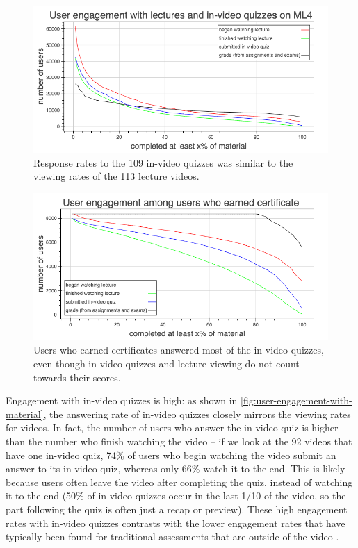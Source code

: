 \documentclass{sigchi}
\begin{document}
\begin{figure}
\includegraphics[width=1.0\columnwidth]{user-engagement-with-material}
\caption{Response rates to the 109 in-video quizzes was similar to the viewing rates of the 113 lecture videos.}
\label{fig:user-engagement-with-material}
\end{figure}

\begin{figure}
\includegraphics[width=1.0\columnwidth]{user-engagement-certificate}
\caption{Users who earned certificates answered most of the in-video quizzes, even though in-video quizzes and lecture viewing do not count towards their scores.}
\label{fig:user-engagement-certificate}
\end{figure}

Engagement with in-video quizzes is high: as shown in \autoref{fig:user-engagement-with-material}, the answering rate of in-video quizzes closely mirrors the viewing rates for videos. In fact, the number of users who answer the in-video quiz is higher than the number who finish watching the video -- if we look at the 92 videos that have one in-video quiz, 74\% of users who begin watching the video submit an answer to its in-video quiz, whereas only 66\% watch it to the end. This is likely because users often leave the video after completing the quiz, instead of watching it to the end (50\% of in-video quizzes occur in the last 1/10 of the video, so the part following the quiz is often just a recap or preview). These high engagement rates with in-video quizzes contrasts with the lower engagement rates that have typically been found for traditional assessments that are outside of the video \cite{renedisengagement} \cite{ashton}.
\end{document}
